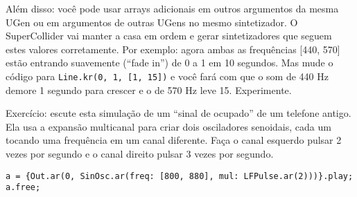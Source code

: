 Além disso: você pode usar arrays adicionais em outros argumentos da mesma UGen ou em argumentos de outras UGens no mesmo sintetizador. O SuperCollider vai manter a casa em ordem e gerar sintetizadores que seguem estes valores corretamente. Por exemplo: agora ambas as frequências [440, 570] estão entrando suavemente (“fade in”) de 0 a 1 em 10 segundos. Mas mude o código para \texttt{Line.kr(0, 1, [1, 15])} e você fará com que o som de 440 Hz demore 1 segundo para crescer e o de 570 Hz leve 15. Experimente.

Exercício: escute esta simulação de um “sinal de ocupado” de um telefone antigo. Ela usa a expansão multicanal para criar dois osciladores senoidais, cada um tocando uma frequência em um canal diferente. Faça o canal esquerdo pulsar 2 vezes por segundo e o canal direito pulsar 3 vezes por segundo. 

\medskip
\begin{lstlisting}[style=SuperCollider-IDE, basicstyle=\scttfamily\footnotesize]
a = {Out.ar(0, SinOsc.ar(freq: [800, 880], mul: LFPulse.ar(2)))}.play;
a.free;
\end{lstlisting}
